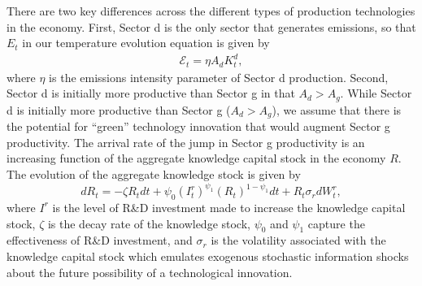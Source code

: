 \documentclass[12pt]{article}
\begin{document}
There are two key differences across the different types of production technologies in the economy. First, Sector d is the only sector that generates emissions, so that $E_t$ in our temperature evolution equation is given by 
\begin{eqnarray*}
    \mathcal{E}_{t}=\eta A_{d}K^d_{t} ,
\end{eqnarray*}
where $\eta$ is the emissions intensity parameter of Sector d production. Second, Sector d is initially more productive than Sector g in that $A_d > A_g$. While Sector d is initially more productive than Sector g ($A_d > A_g$), we assume that there is the potential for ``green'' technology innovation that would augment Sector g productivity. The arrival rate of the jump in Sector g productivity is an increasing function of the aggregate knowledge capital stock in the economy $R$. The evolution of the aggregate knowledge stock is given by
\begin{equation}\label{RD_stock}
d R_t = - \zeta R_t dt + \psi_0 \left(I_t^r\right)^{\psi_1} \left(R_t\right)^{1 - \psi_1} dt + R_t \sigma_r dW^{r}_t ,
\end{equation}
where $I^{r}$ is the level of R\&D investment made to increase the knowledge capital stock, $\zeta$ is the decay rate of the knowledge stock, $\psi_0$ and $\psi_1$ capture the effectiveness of R\&D investment, and $\sigma_{r}$ is the volatility associated with the knowledge capital stock which emulates exogenous stochastic information shocks about the future possibility of a technological innovation.
\end{document}
